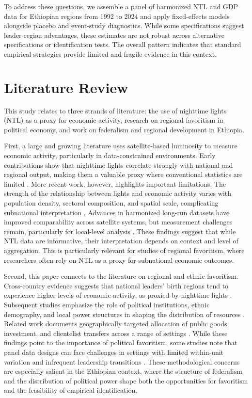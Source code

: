 \documentclass[12pt,a4paper]{article}
\begin{document}
To address these questions, we assemble a panel of harmonized NTL and GDP data for Ethiopian regions from 1992 to 2024 and apply fixed-effects models alongside placebo and event-study diagnostics. While some specifications suggest leader-region advantages, these estimates are not robust across alternative specifications or identification tests. The overall pattern indicates that standard empirical strategies provide limited and fragile evidence in this context.



\section{Literature Review}

This study relates to three strands of literature: the use of nighttime lights (NTL) as a proxy for economic activity, research on regional favoritism in political economy, and work on federalism and regional development in Ethiopia.


First, a large and growing literature uses satellite-based luminosity to measure economic activity, particularly in data-constrained environments. Early contributions show that nighttime lights correlate strongly with national and regional output, making them a valuable proxy where conventional statistics are limited \citep{Chen2011, Henderson2012}. More recent work, however, highlights important limitations. The strength of the relationship between lights and economic activity varies with population density, sectoral composition, and spatial scale, complicating subnational interpretation \citep{Bluhm2022, Gibson2021}. Advances in harmonized long-run datasets have improved comparability across satellite systems, but measurement challenges remain, particularly for local-level analysis \citep{Li2023, Gibson2024}. These findings suggest that while NTL data are informative, their interpretation depends on context and level of aggregation. This is particularly relevant for studies of regional favoritism, where researchers often rely on NTL as a proxy for subnational economic outcomes.

Second, this paper connects to the literature on regional and ethnic favoritism. Cross-country evidence suggests that national leaders’ birth regions tend to experience higher levels of economic activity, as proxied by nighttime lights \citep{Hodler2014}. Subsequent studies emphasize the role of political institutions, ethnic demography, and local power structures in shaping the distribution of resources \citep{BeiserMcGrath2021}. Related work documents geographically targeted allocation of public goods, investment, and clientelist transfers across a range of settings \citep{GoldenMin2013, Onana2024, Cruzatti2024}. While these findings point to the importance of political favoritism, some studies note that panel data designs can face challenges in settings with limited within-unit variation and infrequent leadership transitions \citep{Bertrand2004, Angrist2009, Imbens2015}. These methodological concerns are especially salient in the Ethiopian context, where the structure of federalism and the distribution of political power shape both the opportunities for favoritism and the feasibility of empirical identification.
\end{document}
